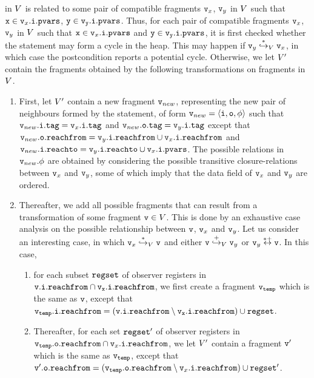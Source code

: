 in $\fragset$ is related to some pair of compatible fragments $\frag_x$, $\frag_y$ in $\fragset$ such that $\lvarof{x} \in \pvarsat{\inof{\frag_x}}$, $\tt y \in \pvarsat{\inof{\frag_y}}$. 
Thus, for each pair of compatible fragments $\frag_x$, $\frag_y$ in $\fragset$ such that $\lvarof{x} \in \pvarsat{\inof{\frag_x}}$ and $\tt y \in \pvarsat{\inof{\frag_y}}$, it is first checked whether the statement may form
a cycle in the heap. This may happen if
$\frag_y \overset{*}\hookrightarrow_{\fragset}\frag_x$, in which case the postcondition reports a potential cycle.
Otherwise, we let $\fragsetpost$ contain
the fragments obtained by the following transformations on fragments in
$\fragset$.
\begin{enumerate}
  \item
    First, let $\fragsetpost$ contain a new fragment $\frag_{new}$, representing
    the new pair of neighbours formed by the statement, of form
    $\frag_{new} = \fragtupleat{\frag_{new}}$ such that
    $\tagat{\inof{\frag_{new}}} = \tagat{\inof{\frag_x}}$ and
    $\tagat{\outof{\frag_{new}}} = \tagat{\inof{\frag_y}}$ except that
    $\reachfromat{\outof{\frag_{new}}} = \reachfromat{\inof{\frag_y}} \cup \reachfromat{\inof{\frag_x}}$ and
    $\reachtoat{\inof{\frag_{new}}} = \reachtoat{\inof{\frag_y}} \cup \pvarsat{\inof{\frag_x}}$.
    The possible relations in $\datarelof{\frag_{new}}$ are obtained by
    considering the possible transitive closure-relations between
    $\frag_x$ and $\frag_y$, some of which imply that the data field of
    $\frag_x$ and $\frag_y$ are ordered.
  \item
    Thereafter, we add all possible fragments that can result from a transformation
of some fragment $\frag \in \fragset$. This is done by an exhaustive
case analysis on the possible
relationship between $\frag$, $\frag_x$ and $\frag_y$.
Let us consider an interesting case, in which
$\frag_x \overset{*}\hookrightarrow_{\fragset} \frag$ and either $\frag \overset{+}\hookrightarrow_{\fragset} \frag_y$ or $\frag_y \overset{*+}\leftrightarrow \frag$.
In this case,
\begin{enumerate}
\item
  for each subset $\regset$ of observer registers in $\tt \reachfromat{\inof{\frag}} \cap \reachfromat{\inof{\frag_x}}$,
  we first create
  a fragment $\frag_{\tt temp}$ which is the same as $\frag$, except that $\reachfromat{\inof{\frag_{\tt temp}}} = (\tt \reachfromat{\inof{\frag}} \setminus \reachfromat{\inof{\frag_x}}) \cup \regset$.
\item
  Thereafter, 
for each set $\regset'$ of observer registers in $\reachfromat{\outof{\frag_{\tt temp}}} \cap \reachfromat{\inof{\frag_x}}$,  we let $\fragsetpost$ contain a fragment
$\frag'$ which is the same as $\frag_{\tt temp}$, except that $\reachfromat{\outof{\frag'}} = (\reachfromat{\outof{\frag_{\tt temp}}} \setminus \reachfromat{\inof{\frag_x}}) \cup \regset'$. 
\end{enumerate}
\end{enumerate}


